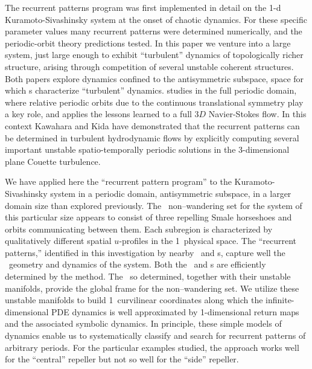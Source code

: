 

The recurrent patterns program
was first implemented in detail on the 1-d
Kuramoto-Sivashinsky system at the onset of chaotic dynamics.
For these specific parameter values many recurrent patterns
were determined numerically, and the periodic-orbit theory
predictions tested.
In this paper we venture into a large {\KS} system, just large
enough to exhibit ``turbulent'' dynamics of topologically richer
structure, arising through
competition of several unstable
coherent structures.
Both papers explore dynamics confined to the
antisymmetric subspace, space for which \po s characterize
``turbulent'' dynamics.
 studies {\KS} in the full periodic domain,
where relative periodic orbits due to the continuous translational
symmetry play a key role, and 
applies the lessons learned to a full 3$D$ Navier-Stokes flow.
In this context Kawahara and Kida have
demonstrated that the recurrent patterns can be determined
in turbulent hydrodynamic flows
by explicitly computing  several important unstable spatio-temporally periodic
solutions in the 3-dimensional plane  Couette turbulence.

We have applied here the ``recurrent pattern program''
to the Kuramoto-Sivashinsky system in a periodic domain,
antisymmetric subspace,
in a larger domain size than explored previously.
The
\statesp\  non--wandering set for the system of this particular size
appears to consist of three
repelling Smale horseshoes and orbits communicating between them.
Each subregion is characterized by
qualitatively different spatial $u$-profiles in the 1\dmn\ physical space.
The ``recurrent patterns,'' identified in this  investigation by
nearby \eqva\ and \po s, capture well the
\statesp\ geometry and dynamics of the system. Both the
\eqva\ and \po s are efficiently determined by
the {\descent} method. The
\eqva\ so determined, together with their unstable
manifolds, provide the global frame for the non--wandering set.
We utilize these unstable manifolds to build 1\dmn\ curvilinear
coordinates along which the
infinite-dimensional PDE dynamics is well approximated by 1-dimensional
return maps and the associated symbolic dynamics. In principle, these
simple models of dynamics enable us to systematically classify and
search for
recurrent patterns of arbitrary periods.
For the particular examples studied, the approach works well for the
``central'' repeller but not so well for the ``side'' repeller.


